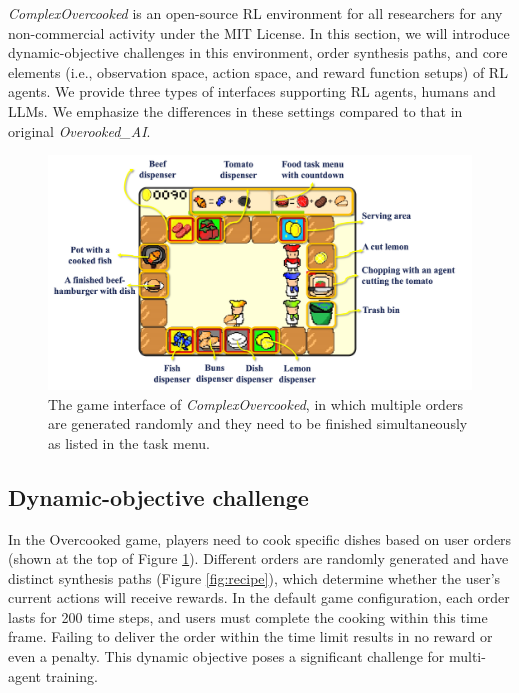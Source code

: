 \textit{ComplexOvercooked} is an open-source RL environment for all researchers for any non-commercial activity under the MIT License. In this section, we will introduce dynamic-objective challenges in this environment, order synthesis paths, and core elements (i.e., observation space, action space, and reward function setups) of RL agents. We provide three types of interfaces supporting RL agents, humans and LLMs. We emphasize the differences in these settings compared to that in original \textit{Overooked\_AI}.
\begin{figure}[htb]
    \centering
    \includegraphics[width=\linewidth]{Figures/game_intro.png}
  \caption{The game interface of \textit{ComplexOvercooked}, in which multiple orders are generated randomly and they need to be finished simultaneously as listed in the task menu.}
\label{fig:intro}
\end{figure}
\subsection{Dynamic-objective challenge}
In the Overcooked game, players need to cook specific dishes based on user orders (shown at the top of Figure \ref{fig:intro}). Different orders are randomly generated and have distinct synthesis paths (Figure \ref{fig:recipe}), which determine whether the user's current actions will receive rewards. In the default game configuration, each order lasts for 200 time steps, and users must complete the cooking within this time frame. Failing to deliver the order within the time limit results in no reward or even a penalty. This dynamic objective poses a significant challenge for multi-agent training.

